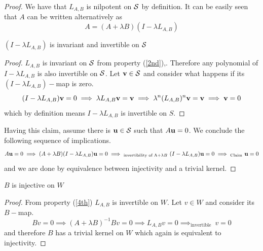 \begin{proof}
    We have that $L_{A,B}$ is nilpotent on $\mathcal{S}$ by definition. It can be easily seen that $A$ can be written alternatively as
    \begin{equation}\label{expForA}
        A=(A+\lambda B)(I-\lambda L_{A,B})
    \end{equation}

    \begin{claim}\label{cl:newinv}
        $(I-\lambda L_{A,B})$ is invariant and invertible on $\mathcal{S}$
    \end{claim}
    \begin{proof}
         $L_{A,B}$ is invariant on $\mathcal{S}$ from property (\ref{2nd}),. Therefore any polynomial of  $I-\lambda L_{A,B}$ is also invertible on $\mathcal{S}$. Let $\mathbf{v}\in \mathcal{S}$ and consider what happens if its $(I-\lambda L_{A,B})-$map is zero. $$(I-\lambda L_{A,B})\mathbf{v}=0\implies \lambda L_{A,B}\mathbf{v} = \mathbf{v}\implies \lambda^n (L_{A,B})^n\mathbf{v}=\mathbf{v}\implies \mathbf{v}=0 $$which by definition means $I-\lambda L_{A,B}$ is invertible on $S$.
    \end{proof}
    Having this claim, assume there is $\mathbf{u}\in \mathcal{S}$ such that $A\mathbf{u}=0$. We conclude the following sequence of implications. $$A\mathbf{u}=0\implies (A+\lambda B)(I-\lambda L_{A,B})\mathbf{u}=0\implies_{\text{invertibility of A+}\lambda B}\ (I-\lambda L_{A,B})\mathbf{u}=0\implies_{\text{Claim}}\ \mathbf{u}=0 $$ and we are done by equivalence between injectivity and a trivial kernel.

\end{proof}
\newpage
\begin{lemma}\label{injectivityB}
    $B$ is injective on $W$
\end{lemma}

\begin{proof}
    From property (\ref{4th}) $L_{A,B}$ is invertible on $W$. Let $v\in W$ and consider its $B-$map. $$Bv=0\implies (A+\lambda B)^{-1}Bv=0\implies L_{A,B} v=0\implies_{\text{invertible}}\  v=0$$and therefore $B$ has a trivial kernel on $W$ which again is equivalent to injectivity.
\end{proof}



